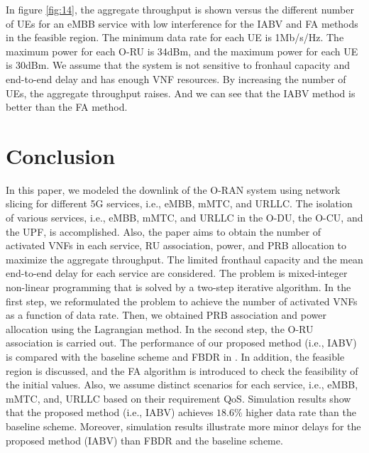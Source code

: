 \documentclass[lettersize,journal]{IEEEtran}
\begin{document}
In figure \ref{fig:14}, the aggregate throughput is shown versus
the different number of UEs for an eMBB service with low interference for the IABV and FA methods in the feasible region.
The minimum data rate for each UE is 1Mb/s/Hz.
The maximum power for each O-RU is 34dBm, and the maximum power for each UE is 30dBm. We assume that the system is not sensitive to fronhaul capacity and end-to-end delay and has enough VNF resources.
By increasing the number of UEs, the aggregate throughput raises.
And we can see that the IABV method is better than the FA method. 
\vspace*{-1.em}
\section{Conclusion}\label{conc}
In this  paper, we modeled the downlink of the O-RAN system using network slicing for different 5G services, i.e., eMBB, mMTC, and URLLC.
The isolation of various services, i.e., eMBB, mMTC, and URLLC in the O-DU, the O-CU, and the UPF, is accomplished.
Also, the paper aims to obtain the number of activated VNFs in each service, RU association, power, and PRB allocation to maximize the aggregate throughput. The limited fronthaul capacity and the mean end-to-end delay for each service are considered. 
The problem is mixed-integer non-linear programming that is solved by a two-step iterative algorithm.
In the first step, we reformulated the problem to achieve the number of activated VNFs as a function of data rate. Then, we obtained PRB association and power allocation using the Lagrangian method.
In the second step, the O-RU association is carried out.
The performance of our proposed method (i.e., IABV) is compared with the baseline scheme and FBDR in \cite{lee2018dynamic}. 
In addition, the feasible region is discussed, and the FA algorithm is introduced to check the feasibility of the initial values.
Also, we assume distinct scenarios for each service, i.e., eMBB, mMTC, and, URLLC based on their requirement QoS.
Simulation results show that the proposed method (i.e., IABV) achieves $18.6\%$ higher data rate than the baseline scheme.
Moreover, simulation results illustrate more minor delays for the proposed method (IABV) than FBDR and the baseline scheme.
\vspace*{-0.7em}
 

\end{document}
